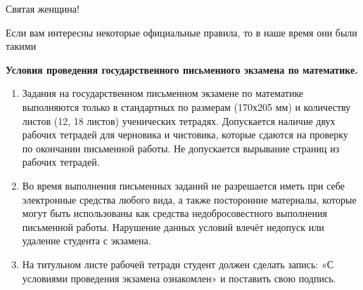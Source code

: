 Святая женщина!

\newpage
Если вам интересны некоторые официальные правила, то в наше время они были такими

\textbf{Условия проведения государственного письменного экзамена по математике.}

\begin{enumerate}
\item Задания на государственном письменном экзамене по математике выполняются только в
стандартных по размерам (170х205 мм) и количеству листов (12, 18 листов) ученических тетрадях.
Допускается наличие двух рабочих тетрадей для черновика и чистовика, которые сдаются на
проверку по окончании письменной работы. Не допускается вырывание страниц из рабочих
тетрадей.
\item Во время выполнения письменных заданий не разрешается иметь при себе электронные
средства любого вида, а также посторонние материалы, которые могут быть использованы как
средства недобросовестного выполнения письменной работы.
Нарушение данных условий влечёт недопуск или удаление студента с экзамена.
\item На титульном листе рабочей тетради студент должен сделать запись:
«С условиями проведения экзамена ознакомлен» и поставить свою подпись.
\end{enumerate}